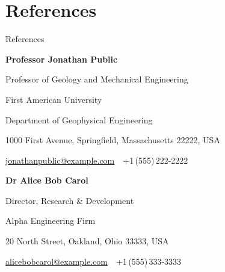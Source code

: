 
\section{References}
{References}

\textbf{Professor Jonathan Public}
\par
Professor of Geology and Mechanical Engineering
\begin{detail}
First American University
\par
Department of Geophysical Engineering
\par
1000 First Avenue, Springfield, Massachusetts 22222, USA
\par
\href{mailto:jonathanpublic@example.com}
{jonathanpublic@example.com}
\,\BulletSymbol\,
+1\,(555)\,222-2222
\end{detail}

\EntryGap
\textbf{Dr Alice Bob Carol}
\par
Director, Research \& Development
\begin{detail}
Alpha Engineering Firm
\par
20 North Street, Oakland, Ohio 33333, USA
\par
\href{mailto:alicebobcarol@example.com}
{alicebobcarol@example.com}
\,\BulletSymbol\,
+1\,(555)\,333-3333
\end{detail}
